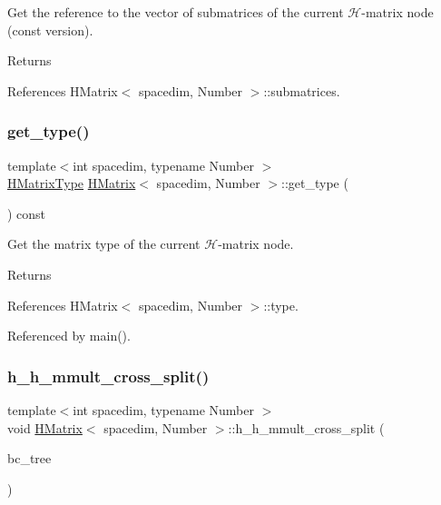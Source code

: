 Get the reference to the vector of submatrices of the current $\mathcal{H}$-\/matrix node (const version). \begin{DoxyReturn}{Returns}

\end{DoxyReturn}


References H\+Matrix$<$ spacedim, Number $>$\+::submatrices.

\mbox{\label{classHMatrix_aadea9fa59f420d22b3b1c939f6b573cc}} 
\subsubsection{\texorpdfstring{get\+\_\+type()}{get\_type()}}
{\footnotesize\ttfamily template$<$int spacedim, typename Number $>$ \\
\hyperlink{hmatrix_8h_ac04719e202c88f36e4533fe1d326a494}{H\+Matrix\+Type} \hyperlink{classHMatrix}{H\+Matrix}$<$ spacedim, Number $>$\+::get\+\_\+type (\begin{DoxyParamCaption}{ }\end{DoxyParamCaption}) const}

Get the matrix type of the current $\mathcal{H}$-\/matrix node. \begin{DoxyReturn}{Returns}

\end{DoxyReturn}


References H\+Matrix$<$ spacedim, Number $>$\+::type.



Referenced by main().

\mbox{\label{classHMatrix_ab315324e3ece178943f406823f792746}} 
\subsubsection{\texorpdfstring{h\+\_\+h\+\_\+mmult\+\_\+cross\+\_\+split()}{h\_h\_mmult\_cross\_split()}}
{\footnotesize\ttfamily template$<$int spacedim, typename Number $>$ \\
void \hyperlink{classHMatrix}{H\+Matrix}$<$ spacedim, Number $>$\+::h\+\_\+h\+\_\+mmult\+\_\+cross\+\_\+split (\begin{DoxyParamCaption}\item[{\hyperlink{classBlockClusterTree}{Block\+Cluster\+Tree}$<$ spacedim, Number $>$ \&}]{bc\+\_\+tree }\end{DoxyParamCaption})}

